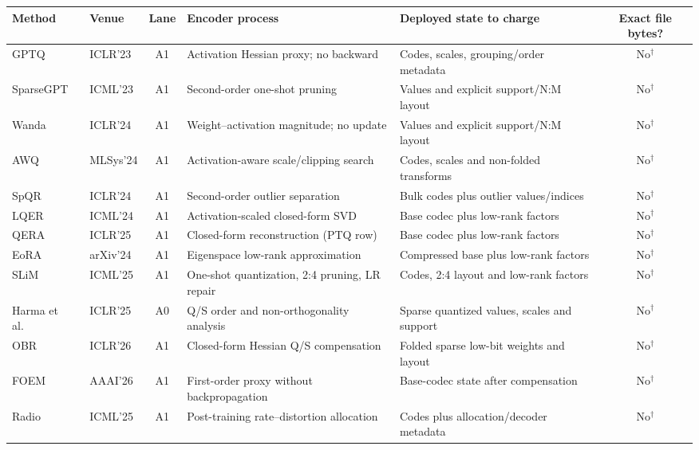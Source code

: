 \scriptsize
\setlength{\tabcolsep}{3pt}
\begin{tabular}{@{}p{2.65cm}p{1.50cm}cp{4.05cm}p{4.10cm}c@{}}
\toprule
Method & Venue & Lane & Encoder process & Deployed state to charge & Exact file bytes? \\
\midrule
GPTQ~\citep{frantar2023gptq} & ICLR'23 & A1 & Activation Hessian proxy; no backward & Codes, scales, grouping/order metadata & No$^\dagger$ \\
SparseGPT~\citep{frantar2023sparsegpt} & ICML'23 & A1 & Second-order one-shot pruning & Values and explicit support/N:M layout & No$^\dagger$ \\
Wanda~\citep{sun2024wanda} & ICLR'24 & A1 & Weight--activation magnitude; no update & Values and explicit support/N:M layout & No$^\dagger$ \\
AWQ~\citep{lin2024awq} & MLSys'24 & A1 & Activation-aware scale/clipping search & Codes, scales and non-folded transforms & No$^\dagger$ \\
SpQR~\citep{dettmers2024spqr} & ICLR'24 & A1 & Second-order outlier separation & Bulk codes plus outlier values/indices & No$^\dagger$ \\
LQER~\citep{zhang2024lqer} & ICML'24 & A1 & Activation-scaled closed-form SVD & Base codec plus low-rank factors & No$^\dagger$ \\
QERA~\citep{zhang2025qera} & ICLR'25 & A1 & Closed-form reconstruction (PTQ row) & Base codec plus low-rank factors & No$^\dagger$ \\
EoRA~\citep{liu2024eora} & arXiv'24 & A1 & Eigenspace low-rank approximation & Compressed base plus low-rank factors & No$^\dagger$ \\
SLiM~\citep{mozaffari2025slim} & ICML'25 & A1 & One-shot quantization, 2:4 pruning, LR repair & Codes, 2:4 layout and low-rank factors & No$^\dagger$ \\
Harma et al.~\citep{harma2025effective} & ICLR'25 & A0 & Q/S order and non-orthogonality analysis & Sparse quantized values, scales and support & No$^\dagger$ \\
OBR~\citep{guo2026optimal} & ICLR'26 & A1 & Closed-form Hessian Q/S compensation & Folded sparse low-bit weights and layout & No$^\dagger$ \\
FOEM~\citep{zheng2026foem} & AAAI'26 & A1 & First-order proxy without backpropagation & Base-codec state after compensation & No$^\dagger$ \\
Radio~\citep{young2025radio} & ICML'25 & A1 & Post-training rate--distortion allocation & Codes plus allocation/decoder metadata & No$^\dagger$ \\

\end{tabular}
